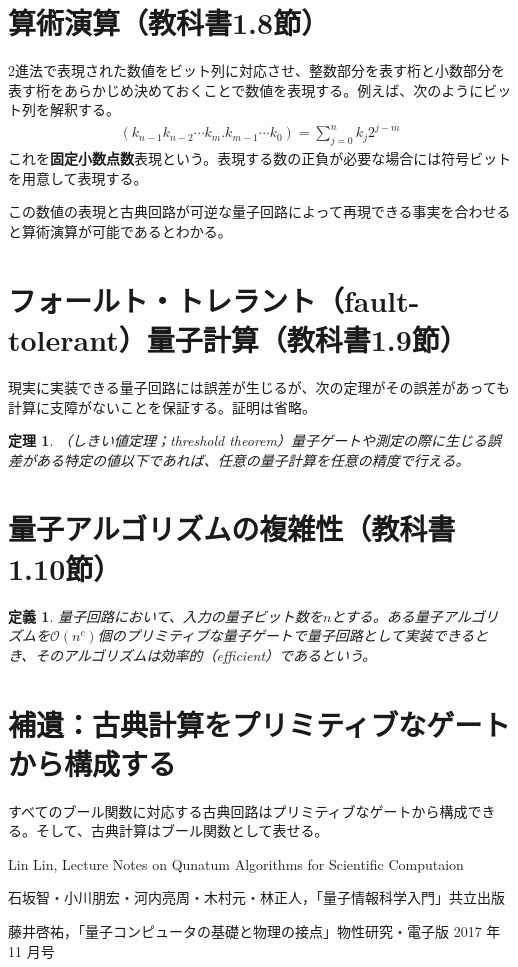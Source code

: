 \documentclass[dvipdfmx]{jarticle}
\numberwithin{equation}{section}
\theoremstyle{seminar}
\newtheorem{theorem}{定理}[section]
\newtheorem{definition}{定義}[section]
\begin{document}
\section{算術演算（教科書1.8節）}
2進法で表現された数値をビット列に対応させ、整数部分を表す桁と小数部分を表す桁をあらかじめ決めておくことで数値を表現する。例えば、次のようにビット列を解釈する。
\begin{align}
  (k_{n-1}k_{n-2} \cdots k_{m} . k_{m -1} \cdots k_0) = \sum_{j = 0}^{n} k_j 2^{j - m}
\end{align}
これを{\bf 固定小数点数}表現という。表現する数の正負が必要な場合には符号ビットを用意して表現する。

この数値の表現と古典回路が可逆な量子回路によって再現できる事実を合わせると算術演算が可能であるとわかる。

\section{フォールト・トレラント（fault-tolerant）量子計算（教科書1.9節）}
現実に実装できる量子回路には誤差が生じるが、次の定理がその誤差があっても計算に支障がないことを保証する。証明は省略。
\begin{theorem}
  （しきい値定理；threshold theorem）量子ゲートや測定の際に生じる誤差がある特定の値以下であれば、任意の量子計算を任意の精度で行える。
\end{theorem}

\section{量子アルゴリズムの複雑性（教科書1.10節）}
\begin{definition}
  量子回路において、入力の量子ビット数を$n$とする。ある量子アルゴリズムを$\mathcal{O}(n^c)$個のプリミティブな量子ゲートで量子回路として実装できるとき、そのアルゴリズムは効率的（efficient）であるという。
\end{definition}

\section*{補遺：古典計算をプリミティブなゲートから構成する}
すべてのブール関数に対応する古典回路はプリミティブなゲートから構成できる。そして、古典計算はブール関数として表せる。

\begin{thebibliography}{9}
  \item  Lin Lin, Lecture Notes on Qunatum Algorithms for Scientific Computaion
  \item  石坂智・小川朋宏・河内亮周・木村元・林正人，「量子情報科学入門」共立出版
  \item  藤井啓祐，「量子コンピュータの基礎と物理の接点」物性研究・電子版 2017 年 11 月号
\end{thebibliography}
\end{document}
